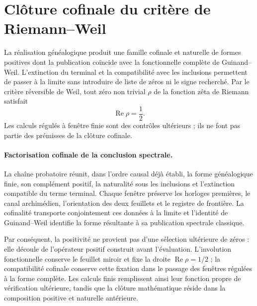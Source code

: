 \section{Clôture cofinale du critère de Riemann--Weil}

La réalisation généalogique produit une famille cofinale et naturelle de formes
positives dont la publication coïncide avec la fonctionnelle complète de
Guinand--Weil. L'extinction du terminal et la compatibilité avec les
inclusions permettent de passer à la limite sans introduire de liste de zéros ni le
signe recherché. Par le critère réversible de Weil, tout zéro non trivial
\(\rho\) de la fonction zêta de Riemann satisfait
\[
  \operatorname{Re}\rho=\frac12.
\]
Les calculs régulés à fenêtre finie sont des contrôles ultérieurs ; ils ne font pas
partie des prémisses de la clôture cofinale.

\paragraph{Factorisation cofinale de la conclusion spectrale.}
La chaîne probatoire réunit, dans l'ordre causal déjà établi, la forme
généalogique finie, son complément positif, la naturalité sous les inclusions et
l'extinction compatible du terme terminal. Chaque fenêtre préserve les horloges
premières, le canal archimédien, l'orientation des deux feuillets et le registre de
frontière. La cofinalité transporte conjointement ces données à la limite et
l'identité de Guinand--Weil identifie la forme résultante à sa publication
spectrale classique.

Par conséquent, la positivité ne provient pas d'une sélection ultérieure de
zéros : elle découle de l'opérateur positif construit avant l'évaluation.
L'involution fonctionnelle conserve le feuillet miroir et fixe la droite
\(\operatorname{Re}\rho=1/2\) ; la compatibilité cofinale conserve cette fixation
dans le passage des fenêtres régulées à la forme complète. Les calculs
finis remplissent ainsi leur fonction propre de vérification ultérieure, tandis que
la clôture mathématique réside dans la composition positive et naturelle antérieure.

